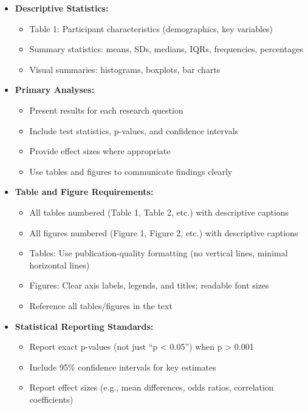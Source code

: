 \documentclass[11pt]{article}
\begin{document}
\begin{itemize}
\item \textbf{Descriptive Statistics:}
  \begin{itemize}
  \item Table 1: Participant characteristics (demographics, key variables)
  \item Summary statistics: means, SDs, medians, IQRs, frequencies, percentages
  \item Visual summaries: histograms, boxplots, bar charts
  \end{itemize}

\item \textbf{Primary Analyses:}
  \begin{itemize}
  \item Present results for each research question
  \item Include test statistics, p-values, and confidence intervals
  \item Provide effect sizes where appropriate
  \item Use tables and figures to communicate findings clearly
  \end{itemize}

\item \textbf{Table and Figure Requirements:}
  \begin{itemize}
  \item All tables numbered (Table 1, Table 2, etc.) with descriptive captions
  \item All figures numbered (Figure 1, Figure 2, etc.) with descriptive captions
  \item Tables: Use publication-quality formatting (no vertical lines, minimal horizontal lines)
  \item Figures: Clear axis labels, legends, and titles; readable font sizes
  \item Reference all tables/figures in the text
  \end{itemize}

\item \textbf{Statistical Reporting Standards:}
  \begin{itemize}
  \item Report exact p-values (not just ``p < 0.05'') when p > 0.001
  \item Include 95\% confidence intervals for key estimates
  \item Report effect sizes (e.g., mean differences, odds ratios, correlation coefficients)
  \end{itemize}
\end{itemize}
\end{document}
